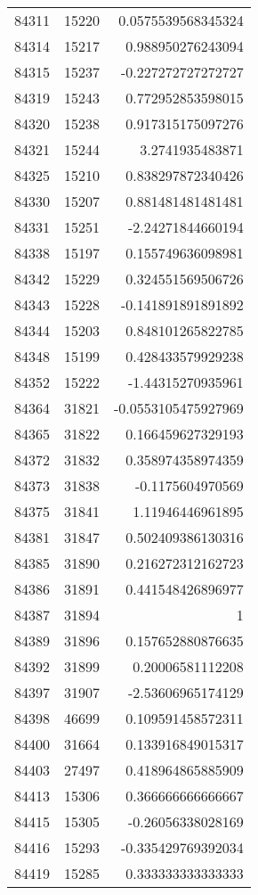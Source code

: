 \begin{tabular}{r | r | r}
84311 & 15220 & 0.0575539568345324 \\
84314 & 15217 & 0.988950276243094 \\
84315 & 15237 & -0.227272727272727 \\
84319 & 15243 & 0.772952853598015 \\
84320 & 15238 & 0.917315175097276 \\
84321 & 15244 & 3.2741935483871 \\
84325 & 15210 & 0.838297872340426 \\
84330 & 15207 & 0.881481481481481 \\
84331 & 15251 & -2.24271844660194 \\
84338 & 15197 & 0.155749636098981 \\
84342 & 15229 & 0.324551569506726 \\
84343 & 15228 & -0.141891891891892 \\
84344 & 15203 & 0.848101265822785 \\
84348 & 15199 & 0.428433579929238 \\
84352 & 15222 & -1.44315270935961 \\
84364 & 31821 & -0.0553105475927969 \\
84365 & 31822 & 0.166459627329193 \\
84372 & 31832 & 0.358974358974359 \\
84373 & 31838 & -0.1175604970569 \\
84375 & 31841 & 1.11946446961895 \\
84381 & 31847 & 0.502409386130316 \\
84385 & 31890 & 0.216272312162723 \\
84386 & 31891 & 0.441548426896977 \\
84387 & 31894 & 1 \\
84389 & 31896 & 0.157652880876635 \\
84392 & 31899 & 0.20006581112208 \\
84397 & 31907 & -2.53606965174129 \\
84398 & 46699 & 0.109591458572311 \\
84400 & 31664 & 0.133916849015317 \\
84403 & 27497 & 0.418964865885909 \\
84413 & 15306 & 0.366666666666667 \\
84415 & 15305 & -0.26056338028169 \\
84416 & 15293 & -0.335429769392034 \\
84419 & 15285 & 0.333333333333333 \\

\end{tabular}
